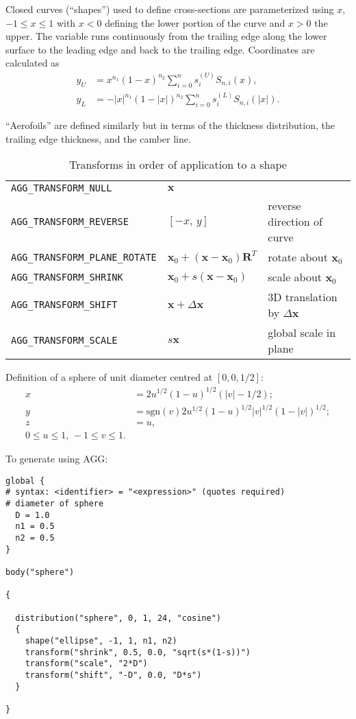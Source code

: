 \documentclass[a4paper,12pt]{article}
\newcommand{\sgn}{\mathrm{sgn}}
\begin{document}
Closed curves (``shapes'') used to define cross-sections are
parameterized using $x$, $-1\leq x \leq 1$ with $x<0$ defining the
lower portion of the curve and $x>0$ the upper. The variable runs
continuously from the trailing edge along the lower surface to the
leading edge and back to the trailing edge. Coordinates are calculated
as
\begin{align}
  \label{equ:curves}
  y_{U} &= x^{n_{1}}(1-x)^{n_{2}}\sum_{i=0}^{n} s_{i}^{(U)}S_{n,i}(x),\\
  y_{L} &= -|x|^{n_{1}}(1-|x|)^{n_{2}}\sum_{i=0}^{n} s_{i}^{(L)}S_{n,i}(|x|).
\end{align}

``Aerofoils'' are defined similarly but in terms of the thickness
distribution, the trailing edge thickness, and the camber line. 

\begin{table}
  \centering
  \begin{tabular}{lll}
    \verb+AGG_TRANSFORM_NULL+  & $\mathbf{x}$& \\
    \verb+AGG_TRANSFORM_REVERSE+  & $[-x,\, y]$ & reverse direction of curve\\
    \verb+AGG_TRANSFORM_PLANE_ROTATE+  &
    $
    \displaystyle
    \mathbf{x}_{0} +
    (\mathbf{x}-\mathbf{x}_{0})\mathbf{R}^{T}
    $
    &
    rotate about $\mathbf{x}_{0}$\\
    \verb+AGG_TRANSFORM_SHRINK+  &
    $\displaystyle\mathbf{x}_{0} + s(\mathbf{x}-\mathbf{x}_{0})$
    & scale about $\mathbf{x}_{0}$\\
    \verb+AGG_TRANSFORM_SHIFT+  & $\mathbf{x} + \Delta\mathbf{x}$&
    3D translation by $\Delta \mathbf{x}$\\
    \verb+AGG_TRANSFORM_SCALE+  & $s\textbf{x}$& global scale in plane
    \\
  \end{tabular}
  \caption{Transforms in order of application to a shape}
  \label{tab:transforms}
\end{table}

Definition of a sphere of unit diameter centred at $[0,0,1/2]$:
\begin{subequations}
  \label{equ:sphere}
  \begin{align}
    x &= 2u^{1/2}(1-u)^{1/2}(|v|-1/2);\\
    y &= \sgn(v)2u^{1/2}(1-u)^{1/2}|v|^{1/2}(1-|v|)^{1/2};\\
    z &= u,\\
    0\leq u\leq 1,\,-1\leq v\leq 1.\nonumber
  \end{align}
\end{subequations}

To generate using AGG:
\begin{verbatim}
global {
# syntax: <identifier> = "<expression>" (quotes required)
# diameter of sphere
  D = 1.0
  n1 = 0.5
  n2 = 0.5
}

body("sphere")

{

  distribution("sphere", 0, 1, 24, "cosine")
  {
    shape("ellipse", -1, 1, n1, n2) 
    transform("shrink", 0.5, 0.0, "sqrt(s*(1-s))")
    transform("scale", "2*D")
    transform("shift", "-D", 0.0, "D*s")
  }

}
\end{verbatim}
\end{document}
